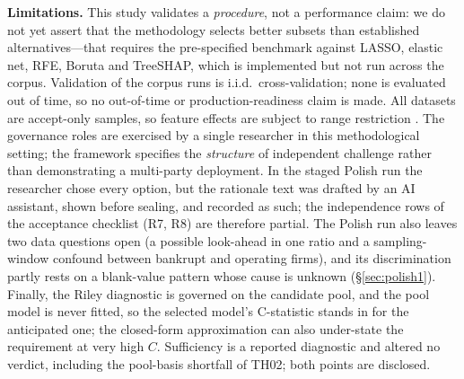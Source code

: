 \documentclass[9pt,journal]{IEEEtai}
\begin{document}
\textbf{Limitations.} This study validates a \emph{procedure}, not a performance claim: we do not
yet assert that the methodology selects better subsets than established alternatives---that requires the
pre-specified benchmark against LASSO, elastic net, RFE, Boruta and TreeSHAP, which is
implemented but not run across the corpus. Validation of the corpus runs is i.i.d.\ cross-validation; none is evaluated out of time, so no
out-of-time or production-readiness claim is made. All datasets are
accept-only samples, so feature effects are subject to range restriction \cite{handhenley1997}.
The governance roles are exercised by a single researcher in this methodological setting; the
framework specifies the \emph{structure} of independent challenge rather than demonstrating a multi-party
deployment. In the staged Polish run the researcher chose every option, but the rationale text was drafted
by an AI assistant, shown before sealing, and recorded as such; the independence rows of the acceptance
checklist (R7, R8) are therefore partial. The Polish run also leaves two data questions open (a possible
look-ahead in one ratio and a sampling-window confound between bankrupt and operating firms), and its
discrimination partly rests on a blank-value pattern whose cause is unknown (\S\ref{sec:polish1}). Finally, the Riley diagnostic is governed on the candidate pool, and the pool model is never
fitted, so the selected model's C-statistic stands in for the anticipated one; the closed-form approximation can also
under-state the requirement at very high $C$. Sufficiency is a reported diagnostic and altered no verdict, including
the pool-basis shortfall of TH02; both points are disclosed.
\end{document}
